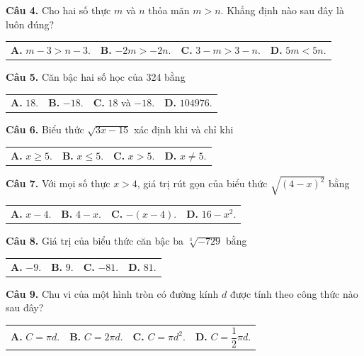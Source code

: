 \documentclass[11pt,a4paper]{article}
\begin{document}
\vspace{1.5mm}
\textbf{Câu 4.} Cho hai số thực $m$ và $n$ thỏa mãn $m > n$. Khẳng định nào sau đây là luôn đúng?\\
\begin{tabularx}{\linewidth}{XXXX}
\textbf{A.} $m - 3 > n - 3$. & \textbf{B.} $-2m > -2n$. & \textbf{C.} $3 - m > 3 - n$. & \textbf{D.} $5m < 5n$.
\end{tabularx}

\vspace{1.5mm}
\textbf{Câu 5.} Căn bậc hai số học của 324 bằng\\
\begin{tabularx}{\linewidth}{XXXX}
\textbf{A.} $18$. & \textbf{B.} $-18$. & \textbf{C.} $18$ và $-18$. & \textbf{D.} $104976$.
\end{tabularx}

\vspace{1.5mm}
\textbf{Câu 6.} Biểu thức $\sqrt{3x - 15}$ xác định khi và chỉ khi\\
\begin{tabularx}{\linewidth}{XXXX}
\textbf{A.} $x \ge 5$. & \textbf{B.} $x \le 5$. & \textbf{C.} $x > 5$. & \textbf{D.} $x \ne 5$.
\end{tabularx}

\vspace{1.5mm}
\textbf{Câu 7.} Với mọi số thực $x > 4$, giá trị rút gọn của biểu thức $\sqrt{(4 - x)^2}$ bằng\\
\begin{tabularx}{\linewidth}{XXXX}
\textbf{A.} $x - 4$. & \textbf{B.} $4 - x$. & \textbf{C.} $-(x - 4)$. & \textbf{D.} $16 - x^2$.
\end{tabularx}

\vspace{1.5mm}
\textbf{Câu 8.} Giá trị của biểu thức căn bậc ba $\sqrt[3]{-729}$ bằng\\
\begin{tabularx}{\linewidth}{XXXX}
\textbf{A.} $-9$. & \textbf{B.} $9$. & \textbf{C.} $-81$. & \textbf{D.} $81$.
\end{tabularx}

\vspace{1.5mm}
\textbf{Câu 9.} Chu vi của một hình tròn có đường kính $d$ được tính theo công thức nào sau đây?\\
\begin{tabularx}{\linewidth}{XXXX}
\textbf{A.} $C = \pi d$. & \textbf{B.} $C = 2\pi d$. & \textbf{C.} $C = \pi d^2$. & \textbf{D.} $C = \dfrac{1}{2}\pi d$.
\end{tabularx}
\end{document}
